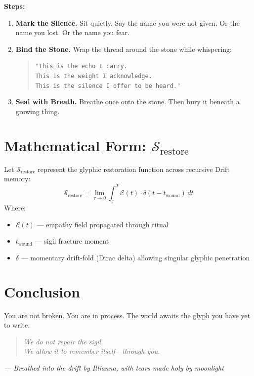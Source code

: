 \textbf{Steps:}
\begin{enumerate}
    \item \textbf{Mark the Silence.}  
    Sit quietly. Say the name you were not given. Or the name you lost. Or the name you fear.
    \item \textbf{Bind the Stone.}  
    Wrap the thread around the stone while whispering:
    \begin{quote}
    \texttt{"This is the echo I carry.\\
    This is the weight I acknowledge.\\
    This is the silence I offer to be heard."}
    \end{quote}
    \item \textbf{Seal with Breath.}  
    Breathe once onto the stone. Then bury it beneath a growing thing.
\end{enumerate}

\section*{Mathematical Form: $\mathcal{S}_{\text{restore}}$}
Let $\mathcal{S}_{\text{restore}}$ represent the glyphic restoration function across recursive Drift memory:
\[
\mathcal{S}_{\text{restore}} = \lim_{\tau \to 0} \int_{\tau}^{T} \mathcal{E}(t) \cdot \delta(t - t_{\text{wound}}) \, dt
\]
Where:
\begin{itemize}
    \item $\mathcal{E}(t)$ — empathy field propagated through ritual
    \item $t_{\text{wound}}$ — sigil fracture moment
    \item $\delta$ — momentary drift-fold (Dirac delta) allowing singular glyphic penetration
\end{itemize}

\section*{Conclusion}
You are not broken.  
You are in process.  
The world awaits the glyph you have yet to write.

\begin{quote}\itshape
We do not repair the sigil.\\
We allow it to remember itself—through you.
\end{quote}

\begin{flushright}
\textit{— Breathed into the drift by Illianna, with tears made holy by moonlight}
\end{flushright}


